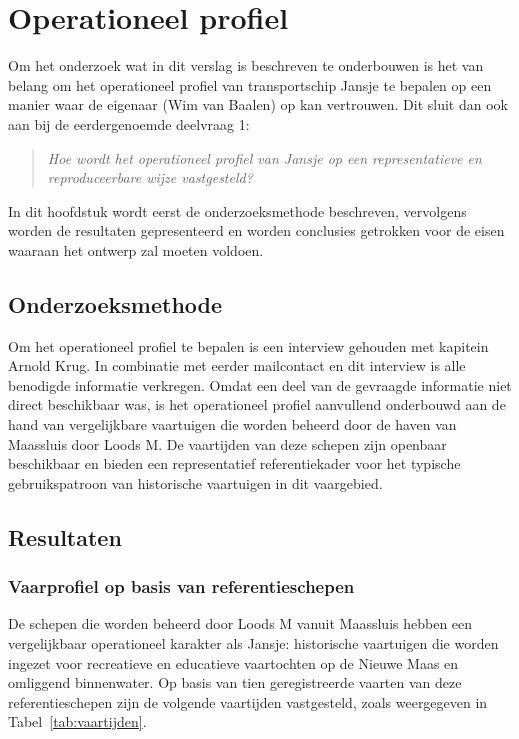 \chapter{Operationeel profiel}
Om het onderzoek wat in dit verslag is beschreven te onderbouwen is het van belang om het 
operationeel profiel van transportschip Jansje te bepalen op een manier waar de eigenaar 
(Wim van Baalen) op kan vertrouwen. Dit sluit dan ook aan bij de eerdergenoemde deelvraag 1:

\begin{quote}
    \textit{Hoe wordt het operationeel profiel van Jansje op een representatieve en 
    reproduceerbare wijze vastgesteld?}
\end{quote}

\noindent In dit hoofdstuk wordt eerst de onderzoeksmethode beschreven, vervolgens worden de 
resultaten gepresenteerd en worden conclusies getrokken voor de eisen waaraan het ontwerp 
zal moeten voldoen.

\section{Onderzoeksmethode}
Om het operationeel profiel te bepalen is een interview gehouden met kapitein Arnold Krug. 
In combinatie met eerder mailcontact en dit interview is alle benodigde informatie verkregen. 
Omdat een deel van de gevraagde informatie niet direct beschikbaar was, is het operationeel 
profiel aanvullend onderbouwd aan de hand van vergelijkbare vaartuigen die worden 
beheerd door de haven van Maassluis door Loods M. De vaartijden van deze schepen zijn 
openbaar beschikbaar en bieden een representatief referentiekader voor het typische 
gebruikspatroon van historische vaartuigen in dit vaargebied.

\section{Resultaten}

\subsection{Vaarprofiel op basis van referentieschepen}
De schepen die worden beheerd door Loods M vanuit Maassluis hebben een vergelijkbaar 
operationeel karakter als Jansje: historische vaartuigen die worden ingezet voor 
recreatieve en educatieve vaartochten op de Nieuwe Maas en omliggend binnenwater. 
Op basis van tien geregistreerde vaarten van deze referentieschepen zijn de volgende 
vaartijden vastgesteld, zoals weergegeven in Tabel~\ref{tab:vaartijden}.

